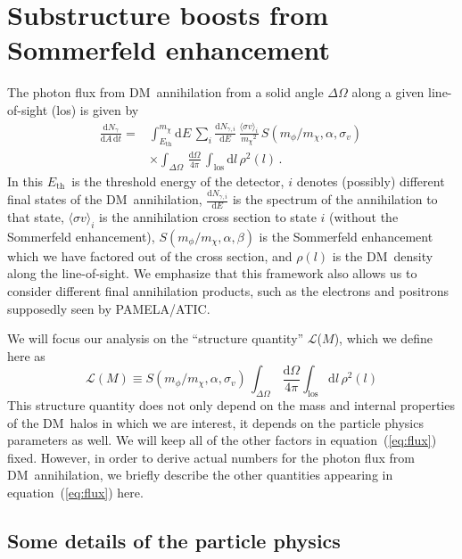 \documentclass[aps,prd,twocolumn,amsmath,amssymb,floatfix,nofootinbib,10pt]{revtex4}
\newcommand{\DM}{DM}
\newcommand{\somm}{\ensuremath{S}}
\newcommand{\mdm}{\ensuremath{m_{\chi}}}
\newcommand{\mv}{\ensuremath{m_{\phi}}}
\newcommand{\dd}{\mathrm{d}}
\newcommand{\eqnname}{equation}
\newcommand{\Ngamma}{\ensuremath{N_{\gamma}}}
\newcommand{\Ngammai}{\ensuremath{N_{\gamma,i}}}
\newcommand{\Eth}{\ensuremath{E_{\mathrm{th}}}}
\newcommand{\sigmaannv}{\ensuremath{\langle\sigma v\rangle}}
\newcommand{\los}{los}
\newcommand{\sigv}{\ensuremath{\sigma_v}}
\newcommand{\lum}{\ensuremath{\mathcal{L}}}
\begin{document}
\section{Substructure boosts from Sommerfeld enhancement}
The photon flux from \DM\ annihilation from a solid angle
$\Delta\Omega$ along a given line-of-sight (\los) is given by
\begin{equation}\label{eq:flux}
\begin{split}
\frac{\dd \Ngamma}{\dd A \,\dd t}  = &
\int_{\Eth}^{\mdm}\dd E\, \sum_i \frac{\dd
\Ngammai}{\dd E} \,\frac{\sigmaannv_i}{\mdm^2}\,
\somm\left(\mv/\mdm,\alpha,\sigv\right)\,\\
& \times \int_{\Delta\Omega}\,\frac{\dd\Omega}{4\pi}\,\int_{\mathrm{\los}} \dd l\,
\rho^2(l)\, .
\end{split}
\end{equation}
In this \Eth\ is the threshold energy of the detector, $i$ denotes
(possibly) different final states of the \DM\ annihilation, $\frac{\dd
\Ngammai}{\dd E}$ is the spectrum of the annihilation to that state,
$\sigmaannv_i$ is the annihilation cross section to state $i$ (without
the Sommerfeld enhancement), $\somm\left(\mv/\mdm,\alpha,\beta\right)$
is the Sommerfeld enhancement which we have factored out of the cross
section, and $\rho(l)$ is the \DM\ density along the line-of-sight. We
emphasize that this framework also allows us to consider different
final annihilation products, such as the electrons and positrons
supposedly seen by PAMELA/ATIC.


We will focus our analysis on the ``structure quantity'' \lum($M$),
which we define here as
\begin{equation}\label{eq:structquant}
\lum(M)\equiv\somm\left(\mv/\mdm,\alpha,\sigv\right)\,\int_{\Delta\Omega}\,\frac{\dd\Omega}{4\pi}\int_{\mathrm{\los}}
\dd l\, \rho^2(l)
\end{equation}
This structure quantity does not only depend on the mass and internal
properties of the \DM\ halos in which we are interest, it depends on
the particle physics parameters as well. We will keep all of the other
factors in \eqnname\ (\ref{eq:flux}) fixed. However, in order to
derive actual numbers for the photon flux from \DM\ annihilation, we
briefly describe the other quantities appearing in \eqnname\
(\ref{eq:flux}) here.

\subsection{Some details of the particle physics}\label{sec:partphys}
\end{document}

